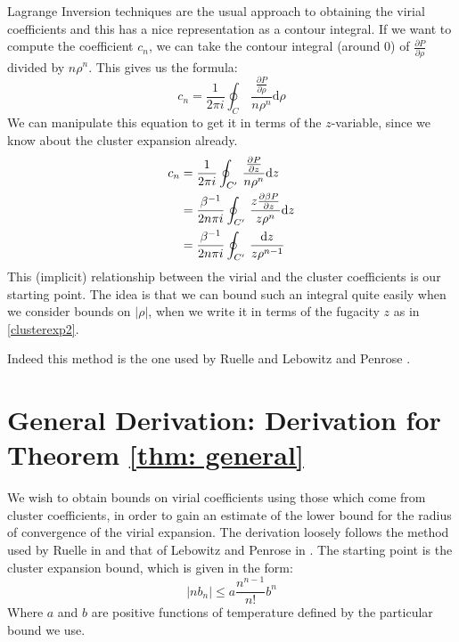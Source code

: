\documentclass[reqno]{amsart}
\def\be{\begin{equation}}
\def\ee{\end{equation}}
\numberwithin{equation}{section}
\begin{document}
Lagrange Inversion techniques are the usual approach to obtaining the virial coefficients and this has a nice representation as a contour integral. If we want to compute the coefficient $c_n$, we can take the contour integral (around $0$) of $\frac{\partial P}{\partial \rho}$ divided by $n\rho^n$. This gives us the formula:
\be c_n = \frac{1}{2\pi i}\oint_C \, \frac{\frac{\partial P}{\partial \rho}}{n\rho^n}\mathrm{d}\rho \ee
We can manipulate this equation to get it in terms of the $z$-variable, since we know about the cluster expansion already.
\begin{align} c_n &= \frac{1}{2 \pi i} \oint_{C'} \, \frac{\frac{\partial P}{\partial z}}{n\rho^n}\mathrm{d}z \notag \\
&= \frac{\beta^{-1}}{2n \pi i} \oint_{C'} \, \frac{z\frac{\partial \beta P}{\partial z}}{z\rho^n} \mathrm{d}z \notag \\
&= \frac{\beta^{-1}}{2n \pi i} \oint_{C'} \, \frac{\mathrm{d}z}{z\rho^{n-1}} \label{contourrep} \end{align}
This (implicit) relationship between the virial and the cluster coefficients is our starting point. The idea is that we can bound such an integral quite easily when we consider bounds on $|\rho|$, when we write it in terms of the fugacity $z$ as in \eqref{clusterexp2}.

Indeed this method is the one used by Ruelle \cite{R69} and Lebowitz and Penrose \cite{LPen64}. 

\section{General Derivation: Derivation for Theorem \ref{thm: general}}
\label{sec: general}
We wish to obtain bounds on virial coefficients using those which come from cluster coefficients, in order to gain an estimate of the lower bound for the radius of convergence of the virial expansion. The derivation loosely follows the method used by Ruelle in \cite{R69} and that of Lebowitz and Penrose in \cite{LPen64}. The starting point is the cluster expansion bound, which is given in the form:
\be |nb_n| \leq a \frac{n^{n-1}}{n!}b^n \label{generalcluster} \ee
Where $a$ and $b$ are positive functions of temperature defined by the particular bound we use.
\end{document}
